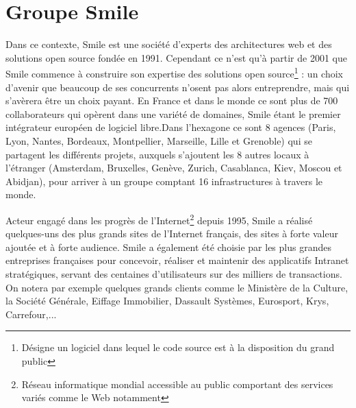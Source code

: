 \documentclass[a4paper,11pt,twoside]{report}
\begin{document}
  \section{Groupe Smile}
  Dans ce contexte, Smile est une société d'experts des architectures web et des solutions open source fondée en 1991. Cependant ce n'est qu'à partir de 2001 que Smile commence à construire son expertise des solutions open source\footnote{Désigne un logiciel dans lequel le code source est à la disposition du grand public} : un choix d’avenir que beaucoup de ses concurrents n’osent pas alors entreprendre, mais qui s'avèrera être un choix payant. En France et dans le monde ce sont plus de 700 collaborateurs qui opèrent dans une variété de domaines, Smile étant le premier intégrateur européen de logiciel libre.Dans l'hexagone ce sont 8 agences (Paris, Lyon, Nantes, Bordeaux, Montpellier, Marseille, Lille et Grenoble) qui se partagent les différents projets, auxquels s'ajoutent les 8 autres locaux à l'étranger (Amsterdam, Bruxelles, Genève, Zurich, Casablanca, Kiev, Moscou et Abidjan), pour arriver à un groupe comptant 16 infrastructures à travers le monde.\newline

  Acteur engagé dans les progrès de l’Internet\footnote{Réseau informatique mondial accessible au public comportant des services variés comme le Web notamment} depuis 1995, Smile a réalisé quelques-uns des plus grands sites de l'Internet français, des sites à forte valeur ajoutée et à forte audience. Smile a également été choisie par les plus grandes entreprises françaises pour concevoir, réaliser et maintenir des applicatifs Intranet stratégiques, servant des centaines d'utilisateurs sur des milliers de transactions. On notera par exemple quelques grands clients comme le Ministère de la Culture, la Société Générale, Eiffage Immobilier, Dassault Systèmes, Eurosport, Krys, Carrefour,...\newline
  
\end{document}

